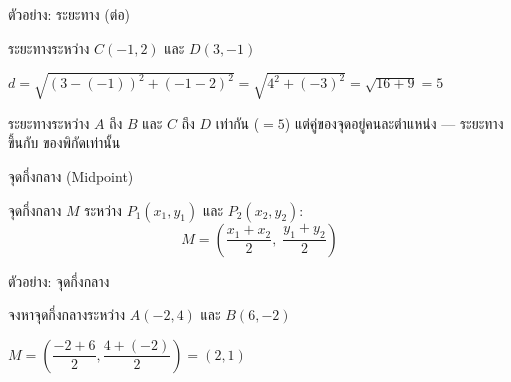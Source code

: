 \documentclass[11pt, aspectratio=169]{beamer}
\begin{document}
\begin{frame}{ตัวอย่าง: ระยะทาง (ต่อ)}
  \begin{exambox}[โจทย์ 2]
    ระยะทางระหว่าง $C(-1,2)$ และ $D(3,-1)$ 

    \medskip
    $d = \sqrt{(3-(-1))^2 + (-1-2)^2}
        = \sqrt{4^2 + (-3)^2}
        = \sqrt{16 + 9} = 5$
  \end{exambox}

  \begin{intuition}[สังเกต]
    ระยะทางระหว่าง $A$ ถึง $B$ และ $C$ ถึง $D$ เท่ากัน ($= 5$)
    แต่คู่ของจุดอยู่คนละตำแหน่ง — ระยะทางขึ้นกับ  ของพิกัดเท่านั้น
  \end{intuition}
\end{frame}

\begin{frame}{จุดกึ่งกลาง (Midpoint)}
  \begin{explanation}
    จุดกึ่งกลาง $M$ ระหว่าง $P_1(x_1, y_1)$ และ $P_2(x_2, y_2)$:
    \[
      M = \left(\frac{x_1 + x_2}{2},\; \frac{y_1 + y_2}{2}\right)
    \]
  \end{explanation}

  \centering

\end{frame}

\begin{frame}{ตัวอย่าง: จุดกึ่งกลาง}
  \begin{exambox}[โจทย์]
    จงหาจุดกึ่งกลางระหว่าง $A(-2, 4)$ และ $B(6, -2)$
  \end{exambox}

  \begin{solbox}[วิธีทำ]
    $M = \left(\dfrac{-2+6}{2}, \dfrac{4+(-2)}{2}\right) = (2, 1)$
  \end{solbox}
\end{frame}
\end{document}
